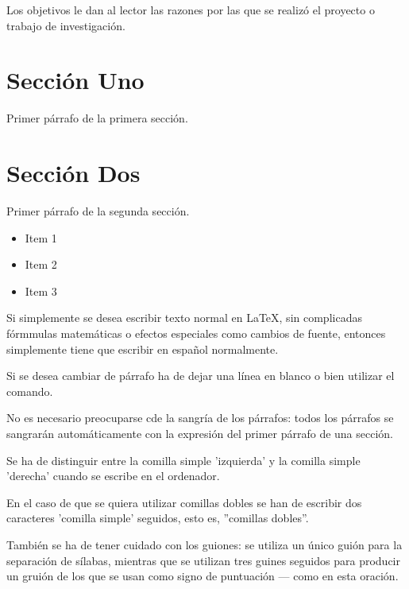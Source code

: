 
Los objetivos le dan al lector las razones por las que se realizó el
proyecto o trabajo de investigación.

\section{Sección Uno}
\label{1:sec:1}
  Primer párrafo de la primera sección.


\section{Sección Dos}
\label{1:sec:2}
  Primer párrafo de la segunda sección.

\begin{itemize}
  \item Item 1
  \item Item 2
  \item Item 3
\end{itemize}
 
 Si simplemente se desea escribir texto normal en LaTeX,
 sin complicadas fórmmulas matemáticas o efectos especiales
 como cambios de fuente, entonces simplemente tiene que escribir
 en español normalmente.\par
 Si se desea cambiar de párrafo ha de dejar una línea en blanco o bien 
 utilizar el comando. \par
 No es necesario preocuparse cde la sangría de los párrafos:
 todos los párrafos se sangrarán automáticamente con la expresión
 del primer párrafo de una sección.\par
 Se ha de distinguir entre la comilla simple 'izquierda'
 y la comilla simple 'derecha' cuando se escribe en el ordenador.\par
 En el caso de que se quiera utilizar comillas dobles se han de 
 escribir dos caracteres 'comilla simple' seguidos, esto es,
 ''comillas dobles''.\par
 También se ha de tener cuidado con los guiones: se utiliza un único
 guión para la separación de sílabas, mientras que se utilizan
 tres guines seguidos para producir un gruión de los que se usan
 como signo de puntuación --- como en esta oración.